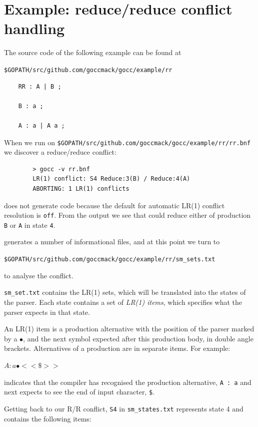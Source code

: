 \documentclass[12pt]{article}
\begin{document}
\section{Example: reduce/reduce conflict handling} \label{sec:example rr}
	The source code of the following example can be found at

	\verb|$GOPATH/src/github.com/goccmack/gocc/example/rr|

	\begin{verbatim}
	RR : A | B ;

	B : a ;

	A : a | A a ;

	\end{verbatim}

	When we run \gocc on \verb|$GOPATH/src/github.com/goccmack/gocc/example/rr/rr.bnf| we discover a reduce/reduce conflict:

	\begin{verbatim}
		> gocc -v rr.bnf
		LR(1) conflict: S4 Reduce:3(B) / Reduce:4(A)
		ABORTING: 1 LR(1) conflicts
	\end{verbatim}

	\gocc does not generate code because the default for automatic LR(1) conflict resolution is \verb|off|. From the output we see that \gocc could reduce either of production \verb|B| or \verb|A| in state \verb|4|.

	\gocc generates a number of informational files, and at this point we turn to

	\verb|$GOPATH/src/github.com/goccmack/gocc/example/rr/sm_sets.txt|

	to analyse the conflict.

	\verb|sm_set.txt| contains the LR(1) sets, which will be translated into the states of the parser. Each state contains a set of {\em LR(1)  items}, which specifies what the parser expects in that state.

	An LR(1) item is a production alternative with the position of the parser marked by a $\bullet$, and the next symbol expected after this production body, in double angle brackets. Alternatives of a production are in  separate items. For example:

	$A : a\bullet <<\$>>$

	indicates that the compiler has recognised the production alternative, \verb|A : a| and  next expects to see the end of input character, \verb|$|.

	Getting back to our R/R conflict, \verb|S4|  in \verb|sm_states.txt| represents state 4 and contains the following items:
\end{document}
